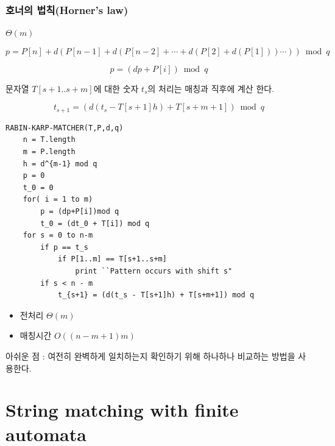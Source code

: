 \documentclass[10pt]{beamer}
\begin{document}




\begin{frame}
    \frametitle{호너의 법칙(Horner's law)}
    
    $\Theta(m)$
    
    $$p = P[n]+ d(P[n-1] + d(P[n-2]+ \cdots + d(P[2] + d(P[1])) \cdots )) \bmod q $$

    $$p = (dp+P[i]) \bmod q$$
    
    문자열 $T[s+1..s+m]$에 대한 숫자 $t_s$의 처리는 매칭과 직후에 계산 한다.
    
    $$t_{s+1} = (d(t_s - T[s+1]h) + T[s+m+1]) \bmod q$$
\end{frame}





\begin{frame}[fragile]

\begin{lstlisting}[style = CStyle]
RABIN-KARP-MATCHER(T,P,d,q)
    n = T.length
    m = P.length
    h = d^{m-1} mod q
    p = 0
    t_0 = 0
    for( i = 1 to m)
        p = (dp+P[i])mod q
        t_0 = (dt_0 + T[i]) mod q
    for s = 0 to n-m
        if p == t_s
            if P[1..m] == T[s+1..s+m]
                print ``Pattern occurs with shift s"
        if s < n - m
            t_{s+1} = (d(t_s - T[s+1]h) + T[s+m+1]) mod q
\end{lstlisting}
    


\end{frame}

\begin{frame}
    \begin{itemize}
        \item 전처리 $\Theta(m)$
        \item 매칭시간 $O((n-m+1)m)$
    \end{itemize}
    
    아쉬운 점 : 여전히 완벽하게 일치하는지 확인하기 위해 하나하나 비교하는 방법을 사용한다.
\end{frame}




\section{String matching with finite automata}
\end{document}
